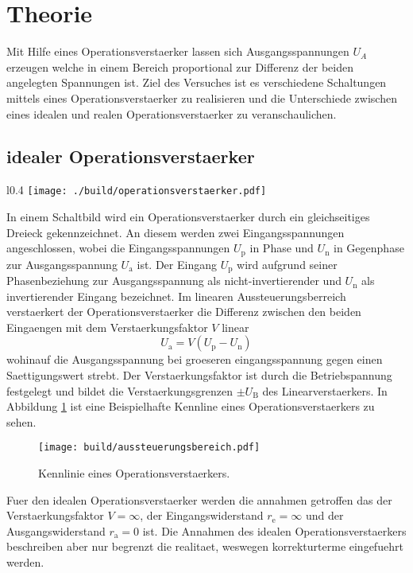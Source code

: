 \section{Theorie}\label{sec:theorie}
Mit Hilfe eines Operationsverstaerker lassen sich Ausgangsspannungen $U_A$
erzeugen welche in einem Bereich proportional zur Differenz der beiden
angelegten Spannungen ist. 
Ziel des Versuches ist es verschiedene Schaltungen mittels eines
Operationsverstaerker zu realisieren und die Unterschiede zwischen eines idealen
und realen Operationsverstaerker zu veranschaulichen.

\subsection{idealer Operationsverstaerker}%
\label{sub:idealer_operationsverstaerker}

\begin{wrapfigure}{l}{0.4\textwidth}
		\centering
		\texttt{[image: ./build/operationsverstaerker.pdf]}
		\caption{Schaltbild eines idealen Operationsverstaerkers.
		\cite{anleitung}}
		\label{fig:opv}
\end{wrapfigure}
In einem Schaltbild wird ein Operationsverstaerker durch ein gleichseitiges
Dreieck gekennzeichnet. 
An diesem werden zwei Eingangsspannungen angeschlossen, wobei die
Eingangsspannungen $U_\text{p}$ in Phase
und $U_\text{n}$ in Gegenphase zur Ausgangsspannung
$U_\text{a}$ ist.
Der Eingang $U_\text{p}$ wird aufgrund seiner Phasenbeziehung zur Ausgangsspannung
als nicht-invertierender und $U_\text{n}$ als invertierender Eingang bezeichnet. 
Im linearen Aussteuerungsberreich verstaerkert der Operationsverstaerker die
Differenz zwischen den beiden Eingaengen mit dem Verstaerkungsfaktor $V$ linear
\begin{equation}
		U_\text{a} = V \left( U_\text{p} - U_\text{n} \right)
\end{equation}
wohinauf die Ausgangsspannung bei groeseren eingangsspannung gegen einen
Saettigungswert strebt.
Der Verstaerkungsfaktor ist durch die Betriebspannung festgelegt
und bildet die Verstaerkungsgrenzen $\pm U_\text{B}$  des Linearverstaerkers.
In Abbildung \ref{fig:kennlinie} ist eine Beispielhafte Kennline eines
Operationsverstaerkers zu sehen. 
\begin{figure}[h]
		\centering
		\texttt{[image: build/aussteuerungsbereich.pdf]}
		\caption{Kennlinie eines Operationsverstaerkers. \cite{anleitung}}
		\label{fig:kennlinie}
\end{figure}
Fuer den idealen Operationsverstaerker werden die annahmen getroffen das der
Verstaerkungsfaktor $V = \infty$, der Eingangswiderstand $r_\text{e} =
\infty$ und der Ausgangswiderstand $r_\text{a} = 0$ ist.
Die Annahmen des idealen Operationsverstaerkers beschreiben aber nur begrenzt
die realitaet, weswegen korrekturterme eingefuehrt werden. 


